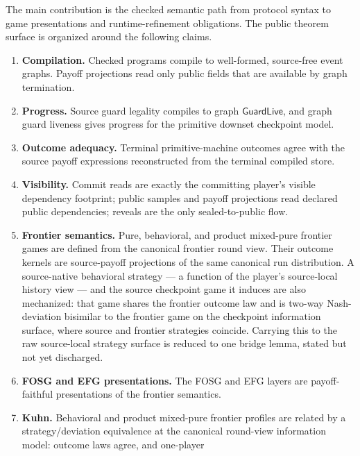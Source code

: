 The main contribution is the checked semantic path from protocol syntax
to game presentations and runtime-refinement obligations.  The public
theorem surface is organized around the following claims.
\begin{enumerate}[leftmargin=1.4em,itemsep=2pt]
\item \textbf{Compilation.}  Checked programs compile to well-formed,
  source-free event graphs.  Payoff projections read only public fields
  that are available by graph termination.
\item \textbf{Progress.}  Source guard legality compiles to graph
  \(\mathsf{GuardLive}\), and graph guard liveness gives progress for
  the primitive downset checkpoint model.
\item \textbf{Outcome adequacy.}  Terminal primitive-machine outcomes
  agree with the source payoff expressions reconstructed from the
  terminal compiled store.
\item \textbf{Visibility.}  Commit reads are exactly the committing
  player's visible dependency footprint; public samples and payoff
  projections read declared public dependencies; reveals are the only
  sealed-to-public flow.
\item \textbf{Frontier semantics.}  Pure, behavioral, and product
  mixed-pure frontier games are defined from the canonical frontier
  round view.  Their outcome kernels are source-payoff projections of
  the same canonical run distribution.  A source-native behavioral
  strategy --- a function of the player's source-local history view ---
  and the source checkpoint game it induces are also mechanized: that
  game shares the frontier outcome law and is two-way Nash-deviation
  bisimilar to the frontier game on the checkpoint information surface,
  where source and frontier strategies coincide.  Carrying this to the
  raw source-local strategy surface is reduced to one bridge lemma,
  stated but not yet discharged.%
\item \textbf{FOSG and EFG presentations.}  The FOSG and EFG layers are
  payoff-faithful presentations of the frontier semantics.
\item \textbf{Kuhn.}  Behavioral and product mixed-pure frontier profiles
  are related by a strategy/deviation equivalence at the canonical
  round-view information model: outcome laws agree, and one-player

\end{enumerate}
